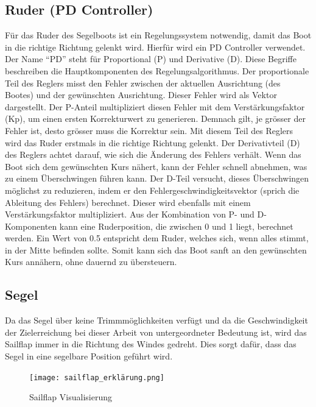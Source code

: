 \subsection{Ruder (PD Controller)}
Für das Ruder des Segelboots ist ein Regelungssystem notwendig, damit das Boot in die richtige Richtung gelenkt wird. Hierfür wird ein PD Controller verwendet. Der Name \enquote{PD} steht für Proportional (P) und Derivative (D). Diese Begriffe beschreiben die Hauptkomponenten des Regelungsalgorithmus. Der proportionale Teil des Reglers misst den Fehler zwischen der aktuellen Ausrichtung (des Bootes) und der gewünschten Ausrichtung. Dieser Fehler wird als Vektor dargestellt. Der P-Anteil multipliziert diesen Fehler mit dem Verstärkungsfaktor (Kp), um einen ersten Korrekturwert zu generieren. Demnach gilt, je grösser der Fehler ist, desto grösser muss die Korrektur sein. Mit diesem Teil des Reglers wird das Ruder erstmals in die richtige Richtung gelenkt. Der Derivativteil (D) des Reglers achtet darauf, wie sich die Änderung des Fehlers verhält. Wenn das Boot sich dem gewünschten Kurs nähert, kann der Fehler schnell abnehmen, was zu einem Überschwingen führen kann. Der D-Teil versucht, dieses Überschwingen möglichst zu reduzieren, indem er den Fehlergeschwindigkeitsvektor (sprich die Ableitung des Fehlers) berechnet. Dieser wird ebenfalls mit einem Verstärkungsfaktor multipliziert. Aus der Kombination von P- und D-Komponenten kann eine Ruderposition, die zwischen 0 und 1 liegt, berechnet werden. Ein Wert von 0.5 entspricht dem Ruder, welches sich, wenn alles stimmt, in der Mitte befinden sollte. Somit kann sich das Boot sanft an den gewünschten Kurs annähern, ohne dauernd zu übersteuern. 
\subsection{Segel}
Da das Segel über keine Trimmmöglichkeiten verfügt und da die Geschwindigkeit der Zielerreichung bei dieser Arbeit von untergeordneter Bedeutung ist, wird das Sailflap immer in die Richtung des Windes gedreht. Dies sorgt dafür, dass das Segel in eine segelbare Position geführt wird.
\begin{figure}
    \centering
    \texttt{[image: sailflap\_erklärung.png]}
    \caption{Sailflap Visualisierung}
    \label{fig:enter-label}
\end{figure}
